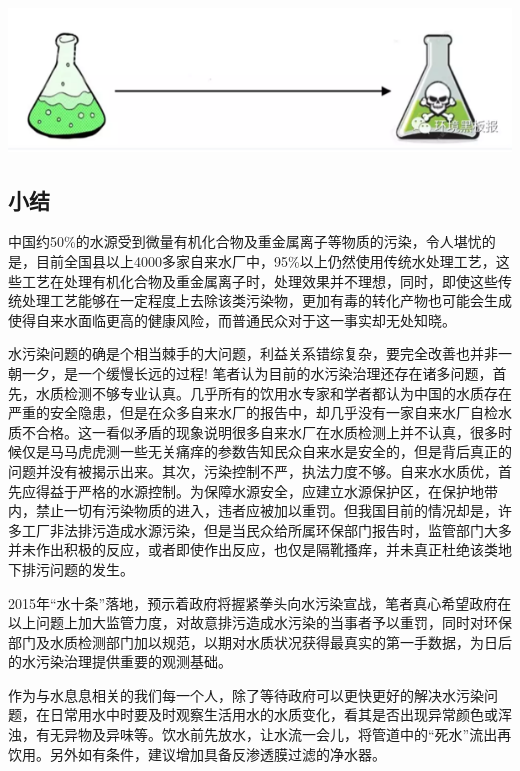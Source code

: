 \documentclass[
]{book}
\begin{document}
\includegraphics[width=8.33in]{images/dushui4}

\hypertarget{ux5c0fux7ed3}{%
\subsection{小结}\label{ux5c0fux7ed3}}

中国约50\%的水源受到微量有机化合物及重金属离子等物质的污染，令人堪忧的是，目前全国县以上4000多家自来水厂中，95\%以上仍然使用传统水处理工艺，这些工艺在处理有机化合物及重金属离子时，处理效果并不理想，同时，即使这些传统处理工艺能够在一定程度上去除该类污染物，更加有毒的转化产物也可能会生成使得自来水面临更高的健康风险，而普通民众对于这一事实却无处知晓。

水污染问题的确是个相当棘手的大问题，利益关系错综复杂，要完全改善也并非一朝一夕，是一个缓慢长远的过程! 笔者认为目前的水污染治理还存在诸多问题，首先，水质检测不够专业认真。几乎所有的饮用水专家和学者都认为中国的水质存在严重的安全隐患，但是在众多自来水厂的报告中，却几乎没有一家自来水厂自检水质不合格。这一看似矛盾的现象说明很多自来水厂在水质检测上并不认真，很多时候仅是马马虎虎测一些无关痛痒的参数告知民众自来水是安全的，但是背后真正的问题并没有被揭示出来。其次，污染控制不严，执法力度不够。自来水水质优，首先应得益于严格的水源控制。为保障水源安全，应建立水源保护区，在保护地带内，禁止一切有污染物质的进入，违者应被加以重罚。但我国目前的情况却是，许多工厂非法排污造成水源污染，但是当民众给所属环保部门报告时，监管部门大多并未作出积极的反应，或者即使作出反应，也仅是隔靴搔痒，并未真正杜绝该类地下排污问题的发生。

2015年``水十条''落地，预示着政府将握紧拳头向水污染宣战，笔者真心希望政府在以上问题上加大监管力度，对故意排污造成水污染的当事者予以重罚，同时对环保部门及水质检测部门加以规范，以期对水质状况获得最真实的第一手数据，为日后的水污染治理提供重要的观测基础。

作为与水息息相关的我们每一个人，除了等待政府可以更快更好的解决水污染问题，在日常用水中时要及时观察生活用水的水质变化，看其是否出现异常颜色或浑浊，有无异物及异味等。饮水前先放水，让水流一会儿，将管道中的``死水''流出再饮用。另外如有条件，建议增加具备反渗透膜过滤的净水器。
\end{document}
